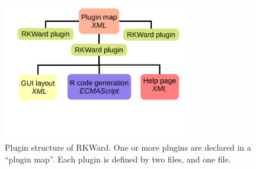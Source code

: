 \begin{figure}[htp]
 \centering
 \includegraphics[width=8cm]{../figures/plugin_structure.pdf}
 \caption{Plugin structure of RKWard. One or more plugins are declared in a ``plugin map''. Each plugin is defined by
 two  files, and one  file.}
 \label{fig:plugin_structure}
\end{figure}

